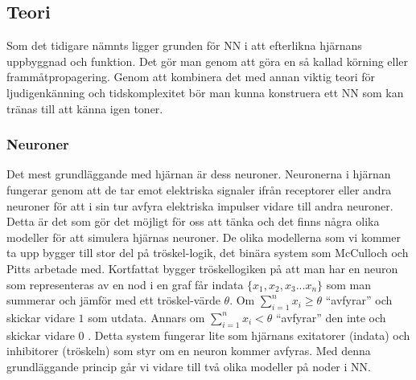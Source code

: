 \documentclass[a4paper,10pt]{article}
\begin{document}
\subsection{Teori}

Som det tidigare nämnts ligger grunden för NN i att efterlikna hjärnans uppbyggnad och funktion. Det gör man genom att göra en så kallad körning eller frammåtpropagering. Genom att kombinera det med annan viktig teori för ljudigenkänning och tidskomplexitet bör man kunna konstruera ett NN som kan tränas till att känna igen toner. 

\subsubsection{Neuroner}
Det mest grundläggande med hjärnan är dess neuroner. Neuronerna i hjärnan fungerar genom att de tar emot elektriska signaler ifrån receptorer eller andra neuroner för att i sin tur avfyra elektriska impulser vidare till andra neuroner. Detta är det som gör det möjligt för oss att tänka och det finns några olika modeller för att simulera hjärnas neuroner. De olika modellerna som vi kommer ta upp bygger till stor del på tröskel-logik, det binära system som McCulloch och Pitts arbetade med. Kortfattat bygger tröskellogiken på att man har en neuron som representeras av en nod i en graf får indata $ \{ x_1,x_2,x_3...x_n \} $ som man summerar och jämför med ett tröskel-värde
$\theta$. Om $ \sum_{i=1}^{n} x_i \geq \theta$ ``avfyrar'' och skickar vidare $1$ som utdata. Annars om $ \sum_{i=1}^{n} x_i < \theta$ ``avfyrar'' den inte och skickar vidare 
$0$ \autocite{Threshold}. Detta system fungerar lite som hjärnans exitatorer (indata) och inhibitorer (tröskeln) som styr om en neuron kommer avfyras. Med denna grundläggande princip går vi vidare till två olika modeller på noder i NN.
\end{document}
